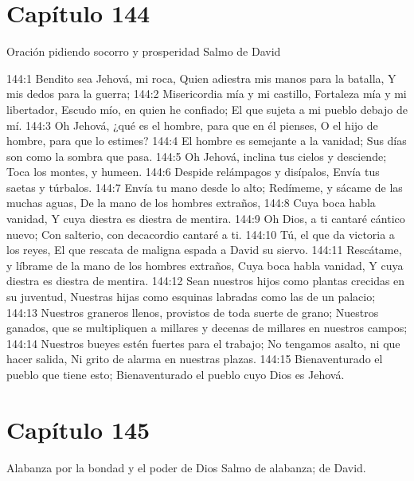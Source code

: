 \section*{Capítulo 144}
Oración pidiendo socorro y prosperidad 
Salmo de David 
 
144:1 Bendito sea Jehová, mi roca, 
Quien adiestra mis manos para la batalla, 
Y mis dedos para la guerra; 
144:2 Misericordia mía y mi castillo, 
Fortaleza mía y mi libertador, 
Escudo mío, en quien he confiado; 
El que sujeta a mi pueblo debajo de mí. 
144:3 Oh Jehová, ¿qué es el hombre, para que en él pienses, 
O el hijo de hombre, para que lo estimes? 
144:4 El hombre es semejante a la vanidad; 
Sus días son como la sombra que pasa. 
144:5 Oh Jehová, inclina tus cielos y desciende; 
Toca los montes, y humeen. 
144:6 Despide relámpagos y disípalos, 
Envía tus saetas y túrbalos. 
144:7 Envía tu mano desde lo alto; 
Redímeme, y sácame de las muchas aguas, 
De la mano de los hombres extraños, 
144:8 Cuya boca habla vanidad, 
Y cuya diestra es diestra de mentira. 
144:9 Oh Dios, a ti cantaré cántico nuevo; 
Con salterio, con decacordio cantaré a ti. 
144:10 Tú, el que da victoria a los reyes, 
El que rescata de maligna espada a David su siervo. 
144:11 Rescátame, y líbrame de la mano de los hombres extraños, 
Cuya boca habla vanidad, 
Y cuya diestra es diestra de mentira. 
144:12 Sean nuestros hijos como plantas crecidas en su juventud, 
Nuestras hijas como esquinas labradas como las de un palacio; 
144:13 Nuestros graneros llenos, provistos de toda suerte de grano; 
Nuestros ganados, que se multipliquen a millares y decenas de millares en nuestros campos; 
144:14 Nuestros bueyes estén fuertes para el trabajo; 
No tengamos asalto, ni que hacer salida, 
Ni grito de alarma en nuestras plazas. 
144:15 Bienaventurado el pueblo que tiene esto; 
Bienaventurado el pueblo cuyo Dios es Jehová. 
\section*{Capítulo 145}
Alabanza por la bondad y el poder de Dios 
Salmo de alabanza; de David. 
 
